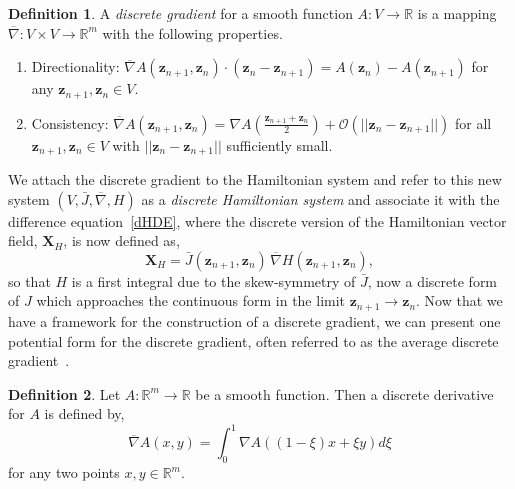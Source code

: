 \documentclass[preprint,12pt]{elsarticle}
\theoremstyle{definition}
\newtheorem{definition}{Definition}[section]
\begin{document}
\begin{definition}
  A \textit{discrete gradient} for a smooth function $A:V \rightarrow \mathbb{R}$ is a mapping $\overline{\nabla}: V \times V \rightarrow \mathbb{R}^m$ with the following properties.
\begin{enumerate}
  \item Directionality: $\overline{\nabla} A(\boldsymbol{z}_{n+1},\boldsymbol{z}_{n}) \cdot (\boldsymbol{z}_{n}-\boldsymbol{z}_{n+1}) = A(\boldsymbol{z}_{n}) - A(\boldsymbol{z}_{n+1})$ for any $\boldsymbol{z}_{n+1},\boldsymbol{z}_{n} \in V$.
  \item Consistency: $\overline{\nabla} A(\boldsymbol{z}_{n+1},\boldsymbol{z}_{n})=\nabla A(\frac{\boldsymbol{z}_{n+1}+\boldsymbol{z}_{n}}{2}) + \mathcal{O}(||\boldsymbol{z}_{n}-\boldsymbol{z}_{n+1}||)$ for all $\boldsymbol{z}_{n+1},\boldsymbol{z}_{n} \in V$ with $||\boldsymbol{z}_{n}-\boldsymbol{z}_{n+1}||$ sufficiently small.
  \end{enumerate}
  \label{DGDef}
\end{definition}
We attach the discrete gradient to the Hamiltonian system and refer to this new system $(V,\bar{J},\overline{\nabla},H)$ as a \textit{discrete Hamiltonian system} and associate it with the difference equation~\eqref{dHDE}, where the discrete version of the Hamiltonian vector field, $\boldsymbol{X}_H$, is now defined as,
\begin{equation}
\boldsymbol{X}_H = \bar{J}(\boldsymbol{z}_{n+1},\boldsymbol{z}_{n}) \, \overline{\nabla} H(\boldsymbol{z}_{n+1},\boldsymbol{z}_{n}),
\end{equation}
so that $H$ is a first integral due to the skew-symmetry of $\bar{J}$, now a discrete form of $J$ which approaches the continuous form in the limit $\boldsymbol{z}_{n+1}\rightarrow \boldsymbol{z}_{n}$. Now that we have a framework for the construction of a discrete gradient, we can present one potential form for the discrete gradient, often referred to as the average discrete gradient~\cite{Harten1997}.

\begin{definition}
  Let $A : \mathbb{R}^m \rightarrow \mathbb{R}$ be a smooth function. Then a discrete derivative for $A$ is defined by,
  \begin{equation}
  \overline{\nabla} A (x,y) = \int_0^1 \nabla A \left(\left(1-\xi\right)x + \xi y \right) d\xi
  \label{DGEq}
  \end{equation}
  for any two points $x, y \in \mathbb{R}^m$.
\label{DGPr}
\end{definition}
\end{document}
